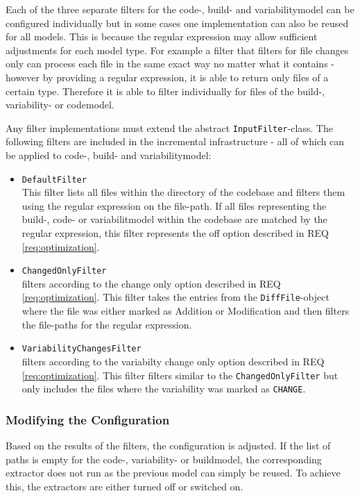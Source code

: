 \documentclass[a4paper]{article}
\begin{document}
Each of the three separate filters for the code-, build- and variabilitymodel can be configured individually but in some cases one implementation can also be reused for all models. This is because the regular expression may allow sufficient adjustments for each model type. For example a filter that filters for file changes only can process each file in the same exact way no matter what it contains - however by providing a regular expression, it is able to return only files of a certain type. Therefore it is able to filter individually for files of the build-, variability- or codemodel.

 Any filter implementations must extend the abstract \texttt{InputFilter}-class. The following filters are included in the incremental infrastructure - all of which can be applied to code-, build- and variabilitymodel:

\begin{itemize}
\item \texttt{DefaultFilter} \\
    This filter lists all files within the directory of the codebase and filters them using the regular expression on the file-path. If all files representing  the build-, code- or variabilitmodel within the codebase are matched by the regular expression, this filter represents the off option described in REQ \ref{req:optimization}. 
\item \texttt{ChangedOnlyFilter} \\
    filters according to the change only option described in REQ \ref{req:optimization}. This filter takes the entries from the \texttt{DiffFile}-object where the file was either marked as Addition or Modification and then filters the file-paths for the regular expression.
\item \texttt{VariabilityChangesFilter} \\
    filters according to the variabilty change only option described in REQ \ref{req:optimization}. This filter filters similar to the \texttt{ChangedOnlyFilter} but only includes the files where the variability was marked as \texttt{CHANGE}.
\end{itemize}

\subsubsection{Modifying the Configuration}

Based on the results of the filters, the configuration is adjusted. If the list of paths is empty for the code-, variability- or buildmodel, the corresponding extractor does not run as the previous model can simply be reused. To achieve this, the extractors are either turned off or switched on. 
\end{document}

